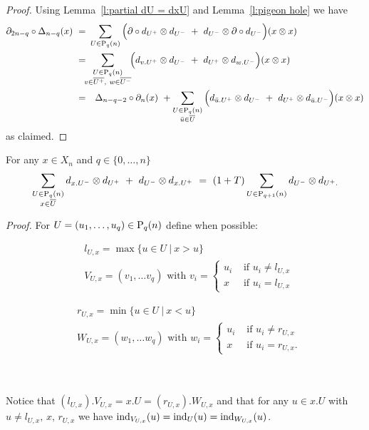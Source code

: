 \begin{proof}
	Using Lemma~\ref{l:partial dU = dxU} and Lemma~\ref{l:pigeon hole} we have
	\begin{equation*}
	\begin{split}
	\partial_{2n-q} \circ \Delta_{n - q} (x) \ = & \
	\sum_{U \in \P_q(n)} \Big( \partial \circ d_{U^+} \tensor d_{U^-}\ +\ d_{U^-} \tensor \partial \circ d_{U^-} \Big) (x \otimes x) \\ = & \!\!
	\sum_{\substack{U \in \P_q(n) \\ v \in \overline{U^+},\ w \in \overline{U^-} } }\!\! \Big( d_{v.U^+} \tensor d_{U^-}\ +\ d_{U^+} \tensor d_{w.U^-}\Big) (x \otimes x) \\ = &
	\quad \Delta_{n-q-2} \circ \partial_n (x) \ + 
	\sum_{\substack{U\in\P_{q}(n) \\ \bar u \in \overline{U}}} \Big( d_{\bar u.U^+} \tensor d_{U^-}\ +\ d_{U^+} \tensor d_{\bar u.U^-}\Big) (x \otimes x)
	\end{split}
	\end{equation*}
	as claimed.
\end{proof}

\begin{lemma} \label{l:large lemma}  
	For any $x \in X_n$ and $q \in \{0, \dots, n\}$
	\begin{equation} \label{lemma4: existence: eq1}
	\sum_{\substack{U \in \P_{q}(n) \\ x \in \overline{U}}} d_{x.U^-} \tensor d_{U^+}\ +\ d_{U^-} \tensor d_{x.U^+}\ = \
	(1+T) \sum_{U \in \P_{q+1}(n)} d_{U^-} \tensor d_{U^+.}
	\end{equation}
\end{lemma}

\textit{Proof.}
For $U = (u_1, \dots, u_q) \in \P_{q}(n)$ define when possible:\\
\begin{minipage}{.5\textwidth}
	\begin{align*}
	& l_{U,x} = \max\{u\in U\ |\ x>u\} \\
	& V_{U,x} = (v_1, \dots v_q) \text{ with }
	v_i = 
	\begin{cases}
	u_i & \text{ if } u_i \neq l_{U,x} \\
	x	& \text{ if } u_i = l_{U,x}
	\end{cases}
	\end{align*} 
\end{minipage}
\begin{minipage}{.5\textwidth}
	\begin{align*}
	& r_{U,x} = \min\{u\in U\ |\ x<u\} \\
	& W_{U,x} = (w_1, \dots w_q) \text{ with }
	w_i = 
	\begin{cases}
	u_i & \text{ if } u_i \neq r_{U,x} \\
	x	& \text{ if } u_i = r_{U,x}.
	\end{cases}
	\end{align*}
\end{minipage}\\ \\
Notice that $(l_{U,x}).V_{U,x} = x.U = (r_{U,x}).W_{U,x}$ and that for any $u \in x.U$ with $u \neq l_{U,x},\, x,\, r_{U,x}$ we have $\ind_{V_{U,x}}(u) = \ind_{U}(u) = \ind_{W_{U,x}}(u)$.


